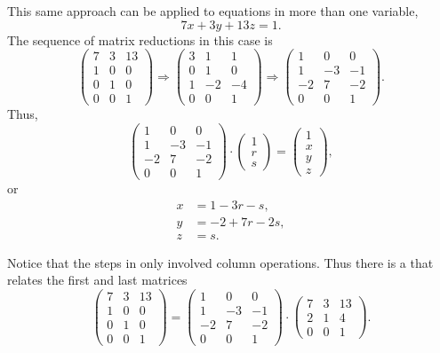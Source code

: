 This same approach can be applied to equations in more than one
variable, \eg 
\[
7x + 3y + 13 z = 1.
\]
The sequence of matrix reductions in this case is
\begin{equation}\label{Dio:3D:Steps:Eq}
\begin{pmatrix}7 & 3 & 13 \\ 1 & 0 & 0 \\ 0 & 1 & 0 \\ 0 & 0 & 1 \end{pmatrix}
\Longrightarrow
\begin{pmatrix}3 & 1 & 1 \\ 0 & 1 & 0 \\ 1 & -2 & -4 \\ 0 & 0 & 1 \end{pmatrix}
\Longrightarrow
\begin{pmatrix}1 & 0 & 0 \\ 1 & -3 & -1 \\ -2 & 7 & -2 \\ 0 & 0 & 1 \end{pmatrix}.
\end{equation}
Thus,
\[
\begin{pmatrix}1 & 0 & 0 \\ 1 & -3 & -1 \\ -2 & 7 & -2 \\ 0 & 0 & 1 \end{pmatrix}
\cdot \begin{pmatrix}1 \\ r \\ s\end{pmatrix} = \begin{pmatrix}1 \\ x \\ y \\ z\end{pmatrix},
\]
or
\[
\begin{aligned}
x & = 1 - 3 r - s, \\
y & = -2 + 7r - 2s,\\
z & = s.
\end{aligned}
\]

Notice that the steps in  only involved column
operations.  Thus there is a  that relates the first
and last matrices
\[
\begin{pmatrix}7 & 3 & 13 \\ 1 & 0 & 0 \\ 0 & 1 & 0 \\ 0 & 0 & 1 \end{pmatrix}
= 
\begin{pmatrix}1 & 0 & 0 \\ 1 & -3 & -1 \\ -2 & 7 & -2 \\ 0 & 0 & 1 \end{pmatrix}
 \cdot
\begin{pmatrix}7 & 3 & 13\\ 2 & 1 & 4 \\ 0 & 0 & 1 \end{pmatrix}.
\]

